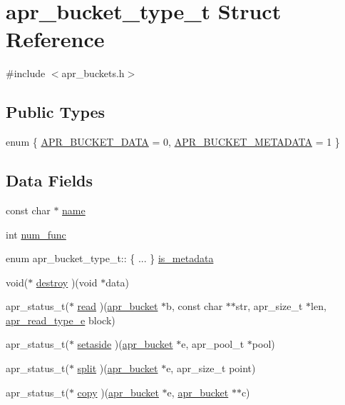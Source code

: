 \hypertarget{structapr__bucket__type__t}{\section{apr\-\_\-bucket\-\_\-type\-\_\-t Struct Reference}
\label{structapr__bucket__type__t}
}


{\ttfamily \#include $<$apr\-\_\-buckets.\-h$>$}

\subsection*{Public Types}
\begin{DoxyCompactItemize}
\item 
enum \{ \hyperlink{structapr__bucket__type__t_a117f85e4a58c5e7d7e373705ad138f85a53d3ef9d6a275fe2b72a91acea7017d5}{A\-P\-R\-\_\-\-B\-U\-C\-K\-E\-T\-\_\-\-D\-A\-T\-A} = 0, 
\hyperlink{structapr__bucket__type__t_a117f85e4a58c5e7d7e373705ad138f85a9bf38b4eb3ea41c4af230432ac7a5fb1}{A\-P\-R\-\_\-\-B\-U\-C\-K\-E\-T\-\_\-\-M\-E\-T\-A\-D\-A\-T\-A} = 1
 \}
\end{DoxyCompactItemize}
\subsection*{Data Fields}
\begin{DoxyCompactItemize}
\item 
const char $\ast$ \hyperlink{structapr__bucket__type__t_ac6d779be45de214c6abd2cc205c48901}{name}
\item 
int \hyperlink{structapr__bucket__type__t_ad4bd2ffb03cb2f5f3b3941ce20468038}{num\-\_\-func}
\item 
enum apr\-\_\-bucket\-\_\-type\-\_\-t\-:: \{ ... \}  \hyperlink{structapr__bucket__type__t_a34cef542a8eee5bb734ba8dcd8329711}{is\-\_\-metadata}
\item 
void($\ast$ \hyperlink{structapr__bucket__type__t_aa5a8ae7611ba3be480e3fd12ff3ac352}{destroy} )(void $\ast$data)
\item 
apr\-\_\-status\-\_\-t($\ast$ \hyperlink{structapr__bucket__type__t_a8e9f3f5b2a5513691f3cea130a1aa54b}{read} )(\hyperlink{structapr__bucket}{apr\-\_\-bucket} $\ast$b, const char $\ast$$\ast$str, apr\-\_\-size\-\_\-t $\ast$len, \hyperlink{group___a_p_r___util___bucket___brigades_ga756973fb6392bd1026c3d96b4519776d}{apr\-\_\-read\-\_\-type\-\_\-e} block)
\item 
apr\-\_\-status\-\_\-t($\ast$ \hyperlink{structapr__bucket__type__t_a4e2015fd6e927ed55157a9b003ed5fdb}{setaside} )(\hyperlink{structapr__bucket}{apr\-\_\-bucket} $\ast$e, apr\-\_\-pool\-\_\-t $\ast$pool)
\item 
apr\-\_\-status\-\_\-t($\ast$ \hyperlink{structapr__bucket__type__t_af30959bc15fc60e21224d5e3c8c0a814}{split} )(\hyperlink{structapr__bucket}{apr\-\_\-bucket} $\ast$e, apr\-\_\-size\-\_\-t point)
\item 
apr\-\_\-status\-\_\-t($\ast$ \hyperlink{structapr__bucket__type__t_a300d6b15d55a3a1f13eeec7379100c38}{copy} )(\hyperlink{structapr__bucket}{apr\-\_\-bucket} $\ast$e, \hyperlink{structapr__bucket}{apr\-\_\-bucket} $\ast$$\ast$c)
\end{DoxyCompactItemize}


